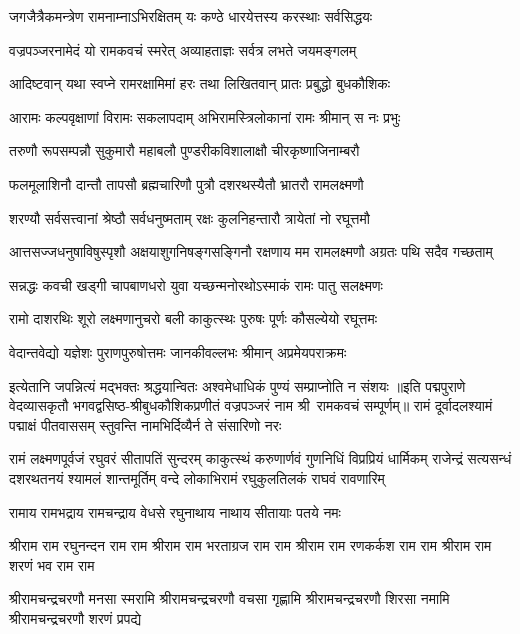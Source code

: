 \twolineshloka
{जगजैत्रैकमन्त्रेण रामनाम्नाऽभिरक्षितम्}
{यः कण्ठे धारयेत्तस्य करस्थाः सर्वसिद्धयः}

\twolineshloka
{वज्रपञ्जरनामेदं यो रामकवचं स्मरेत्}
{अव्याहताज्ञः सर्वत्र लभते जयमङ्गलम्}

\twolineshloka
{आदिष्टवान् यथा स्वप्ने रामरक्षामिमां हरः}
{तथा लिखितवान् प्रातः प्रबुद्धो बुधकौशिकः}

\twolineshloka
{आरामः कल्पवृक्षाणां विरामः सकलापदाम्}
{अभिरामस्त्रिलोकानां रामः श्रीमान् स नः प्रभुः}

\twolineshloka
{तरुणौ रूपसम्पन्नौ सुकुमारौ महाबलौ}
{पुण्डरीकविशालाक्षौ चीरकृष्णाजिनाम्बरौ}

\twolineshloka
{फलमूलाशिनौ दान्तौ तापसौ ब्रह्मचारिणौ}
{पुत्रौ दशरथस्यैतौ भ्रातरौ रामलक्ष्मणौ}

\twolineshloka
{शरण्यौ सर्वसत्त्वानां श्रेष्ठौ सर्वधनुष्मताम्}
{रक्षः कुलनिहन्तारौ त्रायेतां नो रघूत्तमौ}

\twolineshloka
{आत्तसज्जधनुषाविषुस्पृशौ अक्षयाशुगनिषङ्गसङ्गिनौ}
{रक्षणाय मम रामलक्ष्मणौ अग्रतः पथि सदैव गच्छताम्}

\twolineshloka
{सन्नद्धः कवची खड्गी चापबाणधरो युवा}
{यच्छन्मनोरथोऽस्माकं रामः पातु सलक्ष्मणः}

\twolineshloka
{रामो दाशरथिः शूरो लक्ष्मणानुचरो बली}
{काकुत्स्थः पुरुषः पूर्णः कौसल्येयो रघूत्तमः}

\twolineshloka
{वेदान्तवेद्यो यज्ञेशः पुराणपुरुषोत्तमः}
{जानकीवल्लभः श्रीमान् अप्रमेयपराक्रमः}

\twolineshloka
{इत्येतानि जपन्नित्यं मद्भक्तः श्रद्धयान्वितः}
{अश्वमेधाधिकं पुण्यं सम्प्राप्नोति न संशयः}
॥इति पद्मपुराणे वेदव्यासकृतौ भगवद्वसिष्ठ-श्रीबुधकौशिकप्रणीतं वज्रपञ्जरं नाम श्री~रामकवचं सम्पूर्णम्॥
\resetShloka
\twolineshloka
{रामं दूर्वादलश्यामं पद्माक्षं पीतवाससम्}
{स्तुवन्ति नामभिर्दिव्यैर्न ते संसारिणो नरः}

\fourlineindentedshloka
{रामं लक्ष्मणपूर्वजं रघुवरं सीतापतिं सुन्दरम्}
{काकुत्स्थं करुणार्णवं गुणनिधिं विप्रप्रियं धार्मिकम्}
{राजेन्द्रं सत्यसन्धं दशरथतनयं श्यामलं शान्तमूर्तिम्}
{वन्दे लोकाभिरामं रघुकुलतिलकं राघवं रावणारिम्}

\twolineshloka
{रामाय रामभद्राय रामचन्द्राय वेधसे}
{रघुनाथाय नाथाय सीतायाः पतये नमः}

\fourlineindentedshloka
{श्रीराम राम रघुनन्दन राम राम}
{श्रीराम राम भरताग्रज राम राम}
{श्रीराम राम रणकर्कश राम राम}
{श्रीराम राम शरणं भव राम राम}

\fourlineindentedshloka
{श्रीरामचन्द्रचरणौ मनसा स्मरामि}
{श्रीरामचन्द्रचरणौ वचसा गृह्णामि}
{श्रीरामचन्द्रचरणौ शिरसा नमामि}
{श्रीरामचन्द्रचरणौ शरणं प्रपद्ये}

